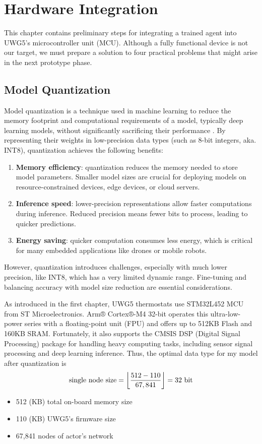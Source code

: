 \documentclass[../main.tex]{subfiles}
\begin{document}
\chapter{Hardware Integration} \label{chap:hw}
This chapter contains preliminary steps for integrating a trained agent into UWG5's microcontroller unit (MCU). Although a fully functional device is not our target, we must prepare a solution to four practical problems that might arise in the next prototype phase.

\section{Model Quantization}
Model quantization is a technique used in machine learning to reduce the memory footprint and computational requirements of a model, typically deep learning models, without significantly sacrificing their performance \cite{soumyad23,rishi2024}. By representing their weights in low-precision data types (such as 8-bit integers, aka. INT8), quantization achieves the following benefits:
\begin{enumerate}
    \item \textbf{Memory efficiency}: quantization reduces the memory needed to store model parameters. Smaller model sizes are crucial for deploying models on resource-constrained devices, edge devices, or cloud servers.
    \item \textbf{Inference speed}: lower-precision representations allow faster computations during inference. Reduced precision means fewer bits to process, leading to quicker predictions.
    \item \textbf{Energy saving}: quicker computation consumes less energy, which is critical for many embedded applications like drones or mobile robots.
\end{enumerate}
However, quantization introduces challenges, especially with much lower precision, like INT8, which has a very limited dynamic range. Fine-tuning and balancing accuracy with model size reduction are essential considerations.

As introduced in the first chapter, UWG5 thermostats use STM32L452 MCU from ST Microelectronics. Arm® Cortex®-M4 32-bit operates this ultra-low-power series with a floating-point unit (FPU) and offers up to 512KB Flash and 160KB SRAM. Fortunately, it also supports the CMSIS DSP (Digital Signal Processing) package for handling heavy computing tasks, including sensor signal processing and deep learning inference. Thus, the optimal data type for my model after quantization is
\begin{equation}
    \text{single node size} = \floor*{\frac{512 - 110}{67,841}} = \text{32 bit}
\end{equation}
\begin{multicols}{2}
    \begin{itemize}
        \item 512 (KB) total on-board memory size
        \item 110 (KB) UWG5's firmware size
        \item 67,841 nodes of actor's network
    \end{itemize}
\end{multicols}
\end{document}
